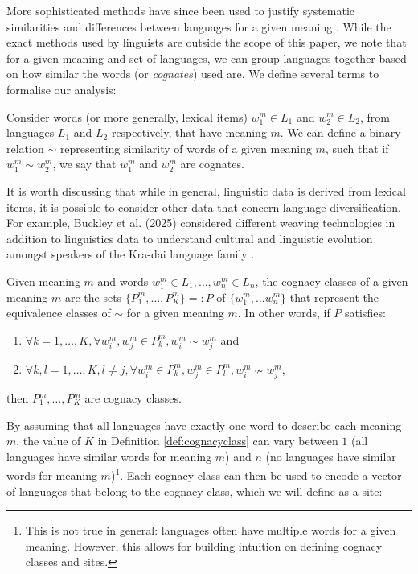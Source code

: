 More sophisticated methods have since been used to justify systematic similarities and differences between languages for a given meaning \cite{Campbell2004}. While the exact methods used by linguists are outside the scope of this paper, we note that for a given meaning and set of languages, we can group languages together based on how similar the words (or \textit{cognates}) used are. We define several terms to formalise our analysis:

\begin{definition} [Cognate]
    Consider words (or more generally, lexical items) $w_1^m \in L_1$ and $w_2^m \in L_2$, from languages $L_1$ and $L_2$ respectively, that have meaning $m$. We can define a binary relation $\sim$ representing similarity of words of a given meaning $m$, such that if $w_1^m \sim w_2^m$, we say that $w_1^m$ and $w_2^m$ are cognates.
\end{definition}

It is worth discussing that while in general, linguistic data is derived from lexical items, it is possible to consider other data that concern language diversification. For example, Buckley et al. (2025) considered different weaving technologies in addition to linguistics data to understand cultural and linguistic evolution amongst speakers of the Kra-dai language family \cite{Buckley2025}.

\begin{definition} 
\label{def:cognacyclass}
    Given meaning $m$ and words $w_1^m \in L_1, \dots, w_n^m \in L_n$, the cognacy classes of a given meaning $m$ are the sets $\{P_1^m, \dots, P_K^m\} =: P$ of $\{w_1^m, \dots w_n^m\}$ that represent the equivalence classes of $\sim$ for a given meaning $m$. In other words, if $P$ satisfies:
    \begin{enumerate}
        \item $\forall k = 1, \dots, K, \forall w_i^m, w_j^m \in P_k^m, w_i^m \sim w_j^m$ and
        \item $\forall k, l = 1, \dots, K, l \neq j, \forall w_i^m \in P_k^m, w_j^m \in P_l^m, w_i^m \nsim w_j^m$,
    \end{enumerate}
    then $P_1^m, \dots, P_K^m$ are cognacy classes.
\end{definition}

By assuming that all languages have exactly one word to describe each meaning $m$, the value of $K$ in Definition \ref{def:cognacyclass} can vary between $1$ (all languages have similar words for meaning $m$) and $n$ (no languages have similar words for meaning $m$)\footnote{This is not true in general: languages often have multiple words for a given meaning. However, this allows for building intuition on defining cognacy classes and sites.}. Each cognacy class can then be used to encode a vector of languages that belong to the cognacy class, which we will define as a site:

